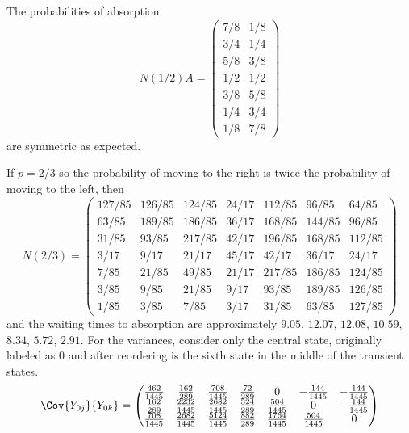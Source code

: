 \documentclass[12pt]{article}
\begin{document}
\begin{example}
    The probabilities of absorption
    \[
        N(1/2) A =
        \begin{pmatrix}
            7/8 & 1/8\\
            3/4 & 1/4\\
            5/8 & 3/8\\
            1/2 & 1/2\\
            3/8 & 5/8\\
            1/4 & 3/4\\
            1/8 & 7/8
        \end{pmatrix}
    \] are symmetric as expected.

    If \( p = 2/3 \) so the probability of moving to the right is twice
    the probability of moving to the left, then
    \[
        N(2/3) =
        \begin{pmatrix}
            127/85 & 126/85 & 124/85 & 24/17 & 112/85 & 96/85 & 64/85\\
            63/85 & 189/85 & 186/85 & 36/17 & 168/85 & 144/85 & 96/85\\
            31/85 & 93/85 & 217/85 & 42/17 & 196/85 & 168/85 & 112/85\\
            3/17 & 9/17 & 21/17 & 45/17 & 42/17 & 36/17 & 24/17\\
            7/85 & 21/85 & 49/85 & 21/17 & 217/85 & 186/85 & 124/85\\
            3/85 & 9/85 & 21/85 & 9/17 & 93/85 & 189/85 & 126/85\\
            1/85 & 3/85 & 7/85 & 3/17 & 31/85 & 63/85 & 127/85
        \end{pmatrix}
    \] and the waiting times to absorption are approximately \( 9.05 \),
    \( 12.07 \), \( 12.08 \), \( 10.59 \), \( 8.34 \), \( 5.72 \), \(
    2.91 \).  For the variances, consider only the central state,
    originally labeled as \( 0 \) and after reordering is the sixth
    state in the middle of the transient states.
    \[
      \Cov{Y_{0j}}{Y_{0k}} =
        \begin{pmatrix}
             \frac{462}{1445} & \frac{162}{289} &
            \frac{708}{1445} & \frac{72}{289} & 0 & -\frac{144}{1445} &
            -\frac{144}{1445}\\
            \frac{162}{289} & \frac{2232}{1445} & \frac{2682}{1445} &
            \frac{324}{289} & \frac{504}{1445} & 0 & -\frac{144}{1445}\\
            \frac{708}{1445} & \frac{2682}{1445} & \frac{5124}{1445} &
            \frac{882}{289} & \frac{1764}{1445} & \frac{504}{1445} & 0\\

\end{pmatrix}\]
\end{example}
\end{document}
